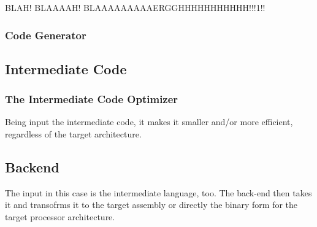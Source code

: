                 \begin{center}\end{center}

                BLAH! BLAAAAH! BLAAAAAAAAAERGGHHHHHHHHHHH!!!1!!

            \subsubsection{Code Generator}


        \subsection{Intermediate Code}

            \subsubsection{The Intermediate Code Optimizer}

                Being input the intermediate code, it makes it smaller and/or more efficient, regardless of the target architecture.

        \subsection{Back\-end}

            The input in this case is the intermediate language, too. The back-end then takes it and transofrms it to the target assembly or directly the binary form for the target processor architecture.

